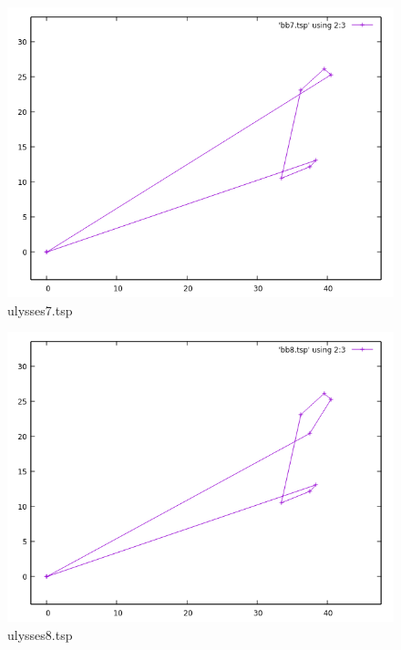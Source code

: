 \documentclass[12pt,spanish]{article}
\begin{document}
\begin{figure}[H]
\centering
\includegraphics[scale=0.75]{bb7.png}
\caption{ulysses7.tsp}
\end{figure}

\begin{figure}[H]
\centering
\includegraphics[scale=0.75]{bb8.png}
\caption{ulysses8.tsp}
\end{figure}
\end{document}
